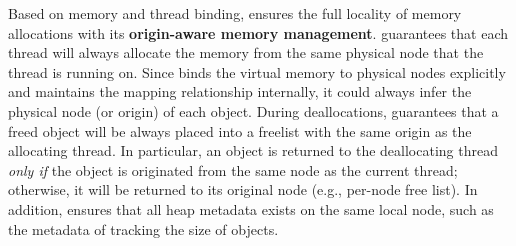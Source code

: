 Based on memory and thread binding, \NM{} ensures the full locality of memory allocations with its \textbf{origin-aware memory management}. \NM{} guarantees that each thread will always allocate the memory from the same physical node that the thread is running on. Since \NM{} binds the virtual memory to physical nodes explicitly and maintains the mapping relationship internally, it could always infer the physical node (or origin) of each object. During deallocations, \NM{} guarantees that a freed object will be always placed into a freelist with the same origin as the allocating thread. In particular, an object is returned to the deallocating thread \textit{only if} the object is originated from the same node as the current thread; otherwise, it will be returned to its original node (e.g., per-node free list). 
In addition, \NM{} ensures that all heap metadata exists on the same local node, such as the metadata of tracking the size of objects.




 


